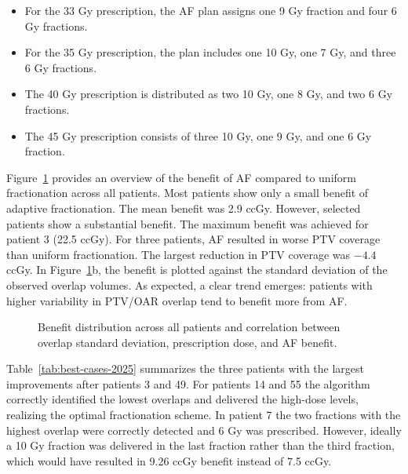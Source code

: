 \documentclass[11pt]{article}
\begin{document}
\begin{itemize}
\item For the 33 Gy prescription, the AF plan assigns one 9 Gy fraction and four 6 Gy fractions.
\item For the 35 Gy prescription, the plan includes one 10 Gy, one 7 Gy, and three 6 Gy fractions.
\item The 40 Gy prescription is distributed as two 10 Gy, one 8 Gy, and two 6 Gy fractions.
\item The 45 Gy prescription consists of three 10 Gy, one 9 Gy, and one 6 Gy fraction.
\end{itemize}

Figure~\ref{fig:benefit-distribution} provides an overview of the benefit of AF compared to uniform fractionation across all patients. Most patients show only a small benefit of adaptive fractionation. The mean benefit was 2.9 ccGy. However, selected patients show a substantial benefit. The maximum benefit was achieved for patient 3 (22.5 ccGy). For three patients, AF resulted in worse PTV coverage than uniform fractionation. The largest reduction in PTV coverage was $-4.4$ ccGy. In Figure~\ref{fig:benefit-distribution}b, the benefit is plotted against the standard deviation of the observed overlap volumes. As expected, a clear trend emerges: patients with higher variability in PTV/OAR overlap tend to benefit more from AF.

\begin{figure}[ht]
\centering
{}
\caption{Benefit distribution across all patients and correlation between overlap standard deviation, prescription dose, and AF benefit.}
\label{fig:benefit-distribution}
\end{figure}

Table~\ref{tab:best-cases-2025} summarizes the three patients with the largest improvements after patients 3 and 49. For patients 14 and 55 the algorithm correctly identified the lowest overlaps and delivered the high-dose levels, realizing the optimal fractionation scheme. In patient 7 the two fractions with the highest overlap were correctly detected and 6 Gy was prescribed. However, ideally a 10 Gy fraction was delivered in the last fraction rather than the third fraction, which would have resulted in 9.26 ccGy benefit instead of 7.5 ccGy.
\end{document}
